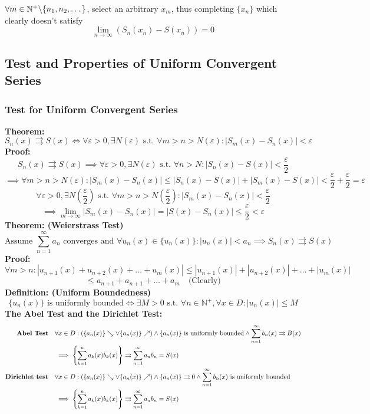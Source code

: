 \documentclass{article}
\newcommand{\ucov}{\rightrightarrows}
\newcommand{\infsum}{\sum\limits_{n=1}^\infty}
\newcommand{\0}{{\bf{0}}}
\begin{document}
$\forall m\in\mathbb{N}^+\symbol{92}\{n_1,n_2,\dots\}$, select an arbitrary $x_m$, thus completing $\{x_n\}$ which clearly doesn't satisfy $$\lim\limits_{n\to\infty}(S_n(x_n)-S(x_n))=0$$
\subsection{Test and Properties of Uniform Convergent Series}
\subsubsection{Test for Uniform Convergent Series}
\textbf{Theorem:}
$$S_n(x)\rightrightarrows S(x)\iff\forall \varepsilon>0,\exists N(\varepsilon)\mbox{ s.t. }\forall m>n>N(\varepsilon):|S_m(x)-S_n(x)|<\varepsilon$$
\textbf{Proof:}
$$S_n(x)\rightrightarrows S(x)\implies\forall\varepsilon>0,\exists N(\varepsilon)\mbox{ s.t. }\forall n>N:|S_n(x)-S(x)|<\frac{\varepsilon}{2}$$
$$\implies\forall m>n>N(\varepsilon):|S_m(x)-S_n(x)|\le|S_n(x)-S(x)|+|S_m(x)-S(x)|<\frac{\varepsilon}{2}+\frac{\varepsilon}{2}=\varepsilon$$
$$$$
$$\forall\varepsilon>0,\exists N\left(\frac{\varepsilon}{2}\right)\mbox{ s.t. }\forall m>n>N\left(\frac{\varepsilon}{2}\right):|S_m(x)-S_n(x)|<\frac{\varepsilon}{2}$$
$$\implies\lim_{m\to\infty}|S_m(x)-S_n(x)|=|S(x)-S_n(x)|\le\frac{\varepsilon}{2}<\varepsilon$$
\textbf{Theorem: (Weierstrass Test)}
$$\mbox{Assume }\sum_{n=1}^\infty a_n\mbox{ converges and }\forall u_n(x)\in\{u_n(x)\}:|u_n(x)|<a_n\implies S_n(x)\rightrightarrows S(x)$$
\textbf{Proof:}
$$\forall m>n:|u_{n+1}(x)+u_{n+2}(x)+\dots+u_{m}(x)|\le|u_{n+1}(x)|+|u_{n+2}(x)|+\dots+|u_{m}(x)|$$
$$\le a_{n+1}+a_{n+1}+\dots+a_{m}\quad\mbox{(Clearly)}$$
\textbf{Definition: (Uniform Boundedness)}
$$\{u_n(x)\}\mbox{ is uniformly bounded}\iff\exists M>0\mbox{ s.t. }\forall n\in\mathbb{N}^+,\forall x\in D:|u_n(x)|\le M$$
\textbf{The Abel Test and the Dirichlet Test:}
\begin{equation}
\begin{split}
    \mbox{\textbf{Abel Test}}\quad&\forall x\in D:(\{a_n(x)\}\searrow\lor\{a_n(x)\}\nearrow)\land \{a_n(x)\}\mbox{ is uniformly bounded}\land \sum\limits_{n=1}^\infty b_n(x)\rightrightarrows B(x)\\
    &\implies\left\{\sum_{k=1}^n a_k(x)b_k(x)\right\}\ucov \infsum a_nb_n=S(x)\\
    \mbox{\textbf{Dirichlet test}}\quad&\forall x\in D:(\{a_n(x)\}\searrow\lor\{a_n(x)\}\nearrow)\land\{a_n(x)\}\ucov0\land\infsum b_n(x)\mbox{ is uniformly bounded}\\
    &\implies\left\{\sum_{k=1}^n a_k(x)b_k(x)\right\}\ucov \infsum a_nb_n=S(x)\\
\end{split}
\end{equation}
\end{document}
